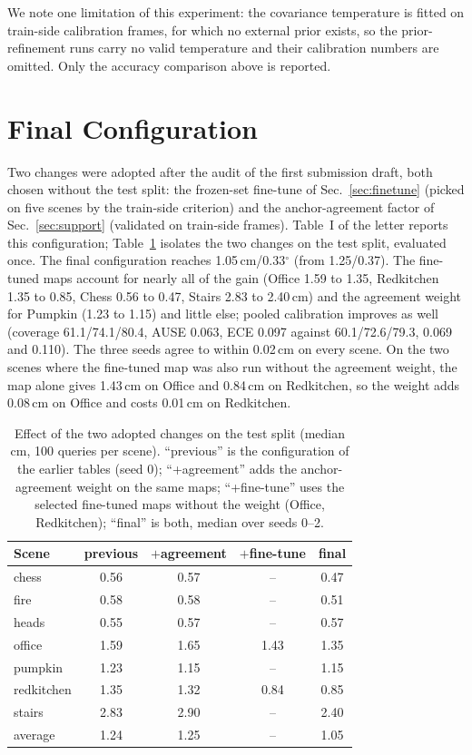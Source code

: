 \documentclass[journal]{IEEEtran}
\begin{document}
We note one limitation of this experiment: the covariance temperature is
fitted on train-side calibration frames, for which no external prior exists,
so the prior-refinement runs carry no valid temperature and their
calibration numbers are omitted. Only the accuracy comparison above is
reported.

\section{Final Configuration}
\label{sec:final}
Two changes were adopted after the audit of the first submission draft, both
chosen without the test split: the frozen-set fine-tune of Sec.~\ref{sec:finetune}
(picked on five scenes by the train-side criterion) and the anchor-agreement
factor of Sec.~\ref{sec:support} (validated on train-side frames). Table~I of
the letter reports this configuration; Table~\ref{tab:final} isolates the two changes on the test split, evaluated once. The final configuration reaches 1.05\,cm/0.33$^\circ$ (from 1.25/0.37). The fine-tuned maps account for nearly all of the gain (Office 1.59 to 1.35, Redkitchen 1.35 to 0.85, Chess 0.56 to 0.47, Stairs 2.83 to 2.40\,cm) and the agreement weight for Pumpkin (1.23 to 1.15) and little else; pooled calibration improves as well (coverage 61.1/74.1/80.4, AUSE 0.063, ECE 0.097 against 60.1/72.6/79.3, 0.069 and 0.110). The three seeds agree to within 0.02\,cm on every scene. On the two scenes where the fine-tuned map was also run without the agreement weight, the map alone gives 1.43\,cm on Office and 0.84\,cm on Redkitchen, so the weight adds 0.08\,cm on Office and costs 0.01\,cm on Redkitchen.

\begin{table}[h]
\caption{Effect of the two adopted changes on the test split (median cm,
100 queries per scene). ``previous'' is the configuration of the earlier
tables (seed 0); ``+agreement'' adds the anchor-agreement weight on the same
maps; ``+fine-tune'' uses the selected fine-tuned maps without the weight
(Office, Redkitchen); ``final'' is both, median over seeds 0--2.}
\label{tab:final}
\centering\footnotesize
\setlength{\tabcolsep}{4pt}
\begin{tabular}{@{}lcccc@{}}
\toprule
Scene & previous & $+$agreement & $+$fine-tune & final \\
\midrule
chess & 0.56 & 0.57 & -- & 0.47 \\
fire & 0.58 & 0.58 & -- & 0.51 \\
heads & 0.55 & 0.57 & -- & 0.57 \\
office & 1.59 & 1.65 & 1.43 & 1.35 \\
pumpkin & 1.23 & 1.15 & -- & 1.15 \\
redkitchen & 1.35 & 1.32 & 0.84 & 0.85 \\
stairs & 2.83 & 2.90 & -- & 2.40 \\
\midrule
average & 1.24 & 1.25 & -- & 1.05 \\
\bottomrule
\end{tabular}
\end{table}
\end{document}
